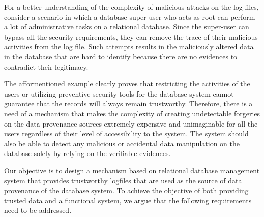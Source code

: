 		For a better understanding of the complexity of malicious attacks on the log files, consider a scenario in which a database super-user who acts as root can perform a lot of administrative tasks on a relational database. Since the super-user can bypass all the security requirements, they can remove the trace of their malicious activities from the log file. Such attempts results in the maliciously altered data in the database that are hard to identify because there are no evidences to contradict their legitimacy.
		
		The afformentioned example clearly proves that restricting the activities of the users or utilizing preventive security tools for the database system cannot guarantee that the records will always remain trustworthy. Therefore, there is a need of a mechanism that makes the complexity of creating undetectable forgeries on the data provenance sources extremely expensive and unimaginable for all the users regardless of their level of accessibility to the system. The system should also be able to detect any malicious or accidental data manipulation on the database solely by relying on the verifiable evidences.

		Our objective is to design a mechanism based on relational database management system that provides trustworthy logfiles that are used as the source of data provenance of the database system. To achieve the objective of both providing trusted data and a functional system, we argue that the following requirements need to be addressed.

